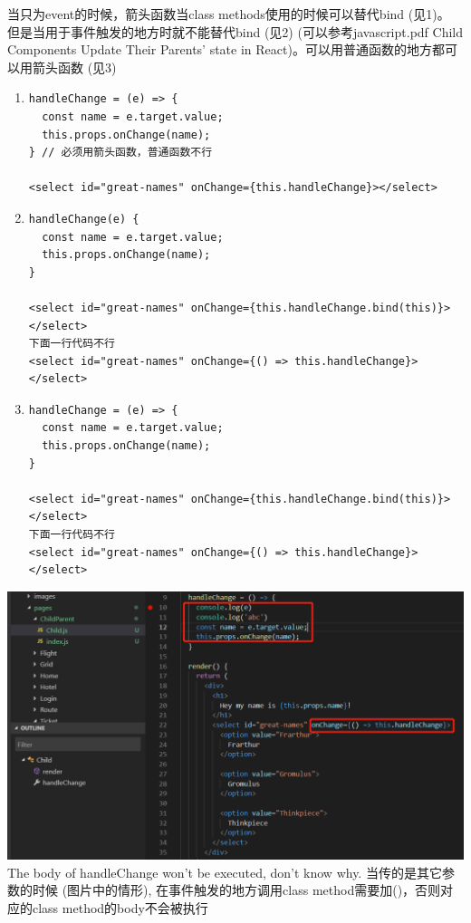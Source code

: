 \documentclass[a4paper, 12pt]{article}
\begin{document}
当只为event的时候，箭头函数当class methods使用的时候可以替代bind (见1)。 但是当用于事件触发的地方时就不能替代bind (见2) (可以参考javascript.pdf Child Components Update Their Parents' state in React)。可以用普通函数的地方都可以用箭头函数 (见3)
\begin{enumerate}
\item \begin{verbatim}
handleChange = (e) => {
  const name = e.target.value;
  this.props.onChange(name);
} // 必须用箭头函数，普通函数不行

<select id="great-names" onChange={this.handleChange}></select>
\end{verbatim}

\item \begin{verbatim}
handleChange(e) {
  const name = e.target.value;
  this.props.onChange(name);
}

<select id="great-names" onChange={this.handleChange.bind(this)}></select>
下面一行代码不行
<select id="great-names" onChange={() => this.handleChange}></select>
\end{verbatim}

\item \begin{verbatim}
handleChange = (e) => {
  const name = e.target.value;
  this.props.onChange(name);
}

<select id="great-names" onChange={this.handleChange.bind(this)}></select>
下面一行代码不行
<select id="great-names" onChange={() => this.handleChange}></select>
\end{verbatim}

\end{enumerate}

\includegraphics[width=6.5in]{./pics/childUpdateParentsState.png}\\
The body of handleChange won't be executed, don't know why. 当传的是其它参数的时候 (图片中的情形), 在事件触发的地方调用class method需要加()，否则对应的class method的body不会被执行
\end{document}
